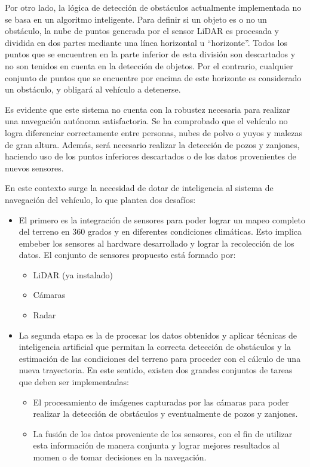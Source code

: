 \documentclass[
11pt, %
]{charter}
\begin{document}
Por otro lado, la lógica de detección de obstáculos actualmente implementada no se basa en un algoritmo inteligente. Para definir si un objeto es o no un obstáculo, la nube de puntos generada por el sensor LiDAR es procesada y dividida en dos partes mediante una línea horizontal u “horizonte”. Todos los puntos que se encuentren en la parte inferior de esta división son descartados y no son tenidos en cuenta en la detección de objetos. Por el contrario, cualquier conjunto de puntos que se encuentre por encima de este horizonte es considerado un obstáculo, y obligará al vehículo a detenerse. 

Es evidente que este sistema no cuenta con la robustez necesaria para realizar una  navegación autónoma satisfactoria. Se ha comprobado que el vehículo no logra diferenciar correctamente entre personas, nubes de polvo o yuyos y malezas de gran altura. Además, será necesario realizar la detección de pozos y zanjones, haciendo uso de los puntos inferiores descartados o  de los datos provenientes de nuevos sensores.

En este contexto surge la necesidad de dotar de inteligencia al sistema de navegación del vehículo, lo que plantea dos desafíos:

\begin{itemize}
\item El primero es la integración de sensores para poder lograr un mapeo completo del terreno en 360 grados y en diferentes condiciones climáticas. Esto implica embeber los sensores al hardware desarrollado y lograr la recolección de los datos. El conjunto de sensores propuesto está formado por:
\begin{itemize}
\item LiDAR (ya instalado)
\item Cámaras 
\item Radar
\end{itemize}
\item La segunda etapa es la de procesar los datos obtenidos y aplicar técnicas de inteligencia artificial que permitan la correcta detección de obstáculos y la estimación de las condiciones del terreno para proceder con el cálculo de una nueva trayectoria. En este sentido, existen dos grandes conjuntos de tareas que deben ser implementadas:
\begin{itemize}
\item El procesamiento de imágenes capturadas por las cámaras para poder realizar la detección de obstáculos y eventualmente de pozos y zanjones.
\item La fusión de los datos proveniente de los sensores, con el fin de utilizar esta información de manera conjunta y lograr mejores resultados al momen o de tomar decisiones en la navegación.
\end{itemize}
\end{itemize}
\end{document}
